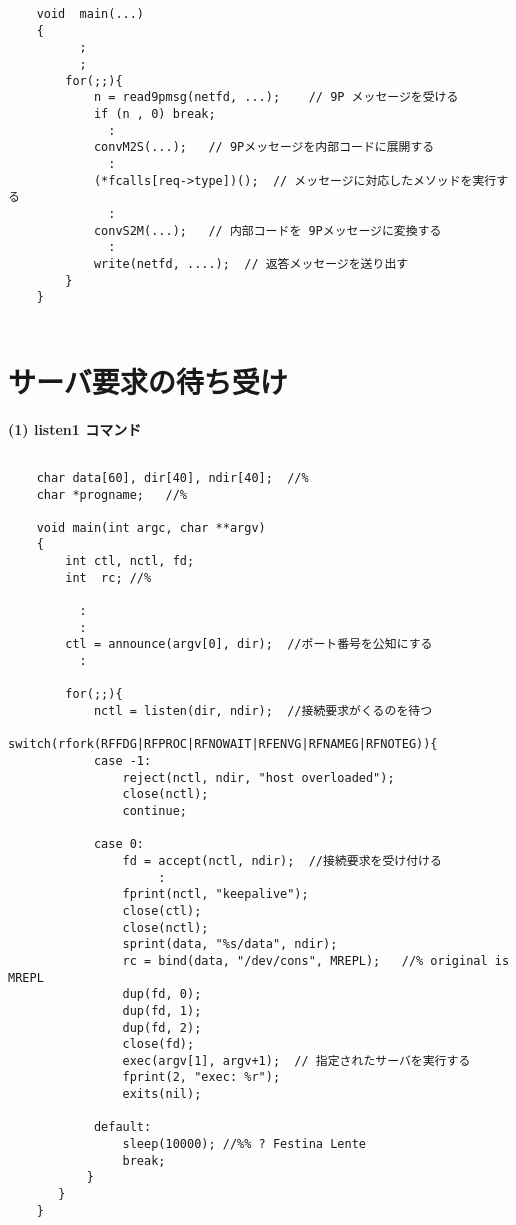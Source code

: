 {{\begin{verbatim}
    void  main(...)
    {
          ;
          ;
        for(;;){ 
            n = read9pmsg(netfd, ...);    // 9P メッセージを受ける
            if (n , 0) break;
              :
            convM2S(...);   // 9Pメッセージを内部コードに展開する
              :
            (*fcalls[req->type])();  // メッセージに対応したメソッドを実行する
              :
            convS2M(...);   // 内部コードを 9Pメッセージに変換する 
              :
            write(netfd, ....);  // 返答メッセージを送り出す
        }
    }
  
\end{verbatim}
}





\section{サーバ要求の待ち受け}
{\bf\flushleft  (1) listen1 コマンド}

{\small
\begin{verbatim}

    char data[60], dir[40], ndir[40];  //%
    char *progname;   //%

    void main(int argc, char **argv)
    {
        int ctl, nctl, fd;
        int  rc; //%

          :
          :
        ctl = announce(argv[0], dir);  //ポート番号を公知にする
          :

        for(;;){
            nctl = listen(dir, ndir);  //接続要求がくるのを待つ
            switch(rfork(RFFDG|RFPROC|RFNOWAIT|RFENVG|RFNAMEG|RFNOTEG)){
            case -1:
                reject(nctl, ndir, "host overloaded");
                close(nctl);
                continue;

            case 0: 
                fd = accept(nctl, ndir);  //接続要求を受け付ける
                     :
                fprint(nctl, "keepalive");
                close(ctl);
                close(nctl);
                sprint(data, "%s/data", ndir);
                rc = bind(data, "/dev/cons", MREPL);   //% original is MREPL
                dup(fd, 0);
                dup(fd, 1);
                dup(fd, 2);
                close(fd);
                exec(argv[1], argv+1);  // 指定されたサーバを実行する
                fprint(2, "exec: %r");
                exits(nil);

            default:
                sleep(10000); //%% ? Festina Lente
                break;
           }
       }
    }



\end{verbatim}}}
